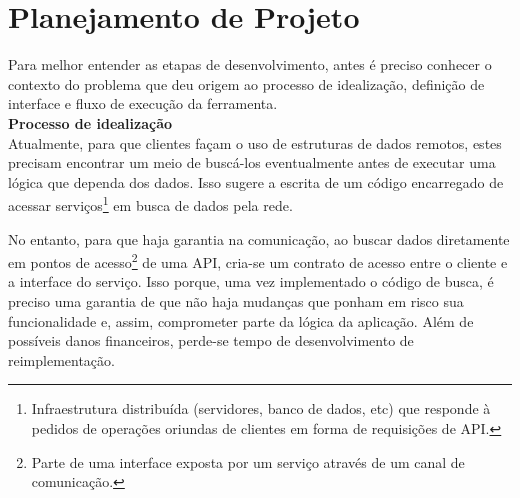 \section{Planejamento de Projeto}

Para melhor entender as etapas de desenvolvimento, antes é preciso conhecer o contexto do problema que deu origem ao processo de idealização, definição de interface e fluxo de execução da ferramenta. \\

\textbf{Processo de idealização} \\

Atualmente, para que clientes façam o uso de estruturas de dados remotos, estes precisam encontrar um meio de buscá-los eventualmente antes de executar uma lógica que dependa dos dados. Isso sugere a escrita de um código encarregado de acessar serviços\footnote{
  Infraestrutura distribuída (servidores, banco de dados, etc) que responde à pedidos de operações oriundas de clientes em forma de requisições de API.
} em busca de dados pela rede.

No entanto, para que haja garantia na comunicação, ao buscar dados diretamente em pontos de acesso\footnote{
  Parte de uma interface exposta por um serviço através de um canal de comunicação.
} de uma API, cria-se um contrato de acesso entre o cliente e a interface do serviço. Isso porque, uma vez implementado o código de busca, é preciso uma garantia de que não haja mudanças que ponham em risco sua funcionalidade e, assim, comprometer parte da lógica da aplicação. Além de possíveis danos financeiros, perde-se tempo de desenvolvimento de reimplementação.

